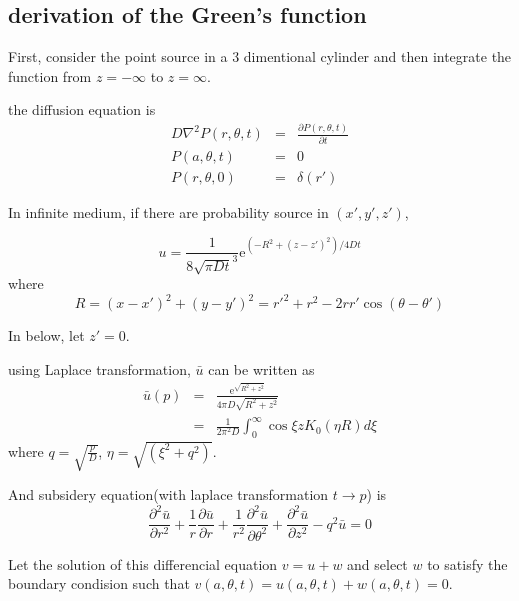 \documentclass{article}
\begin{document}
\subsection{derivation of the Green's function}

First, consider the point source in a 3 dimentional cylinder
and then integrate the function from $z = -\infty$ to $z = \infty$.

the diffusion equation is
\begin{eqnarray}
    D\nabla^2 P(r, \theta, t) &=& \frac{\partial P(r, \theta, t)}{\partial t} \nonumber \\
    P(a, \theta, t) &=& 0 \nonumber \\
    P(r, \theta, 0) &=& \delta(r')
\end{eqnarray}

In infinite medium, if there are probability source in $(x',y',z')$,

\begin{equation}
    u = \frac{1}{8\sqrt{\pi Dt}^{3}}\mathrm{e}^{(-R^2 + (z - z')^2) / 4Dt}
\end{equation}
where
\begin{equation}
    R = (x - x')^2 + (y - y')^2 = r'^2 + r^2 - 2rr'\cos(\theta - \theta')
\end{equation}

In below, let $z' = 0$.

using Laplace transformation, $\bar{u}$ can be written as
\begin{eqnarray}
    \bar{u}(p) &=& \frac{\mathrm{e}^{\sqrt{R^2 + z^2}}}
                      {4\pi D\sqrt{R^2 + z^2}} \nonumber \\
               &=& \frac{1}{2\pi^2 D}\int^{\infty}_{0}
                   \cos{\xi z}K_0(\eta R)d\xi \label{Subequ}
\end{eqnarray}
where $q = \sqrt{\frac{p}{D}}$, $\eta = \sqrt{(\xi^2 + q^2)}$.

And subsidery equation(with laplace transformation $t \to p$) is
\begin{equation}
    \frac{\partial^2 \bar{u}}{\partial r^2} +
    \frac{1}{r}\frac{\partial \bar{u}}{\partial r} +
    \frac{1}{r^2} \frac{\partial^2 \bar{u}}{\partial \theta^2} + 
    \frac{\partial^2 \bar{u}}{\partial z^2} -
    q^2 \bar{u} = 0
\end{equation}

Let the solution of this differencial equation $v = u + w$ 
and select $w$ to satisfy the boundary condision such that 
$v(a, \theta, t) = u(a, \theta, t) + w(a, \theta, t) = 0$.
\end{document}
